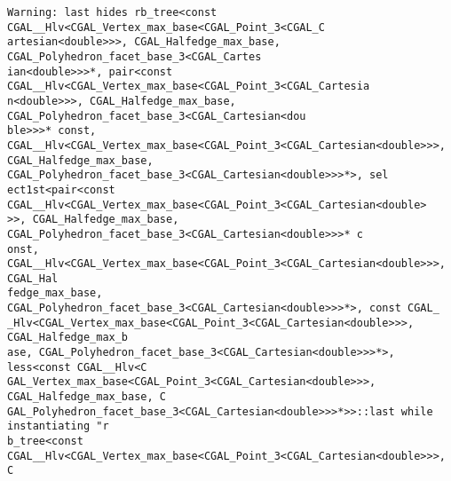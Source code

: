 
\begin{titlepage}
\begin{lcTexBlock}
{\color[gray]{0.2}%
\verb+Warning: last hides rb_tree<const CGAL__Hlv<CGAL_Vertex_max_base<CGAL_Point_3<CGAL_C+\\
\verb+artesian<double>>>, CGAL_Halfedge_max_base, CGAL_Polyhedron_facet_base_3<CGAL_Cartes+\\
\verb+ian<double>>>*, pair<const CGAL__Hlv<CGAL_Vertex_max_base<CGAL_Point_3<CGAL_Cartesia+\\
\verb+n<double>>>, CGAL_Halfedge_max_base, CGAL_Polyhedron_facet_base_3<CGAL_Cartesian<dou+\\
\verb+ble>>>* const, CGAL__Hlv<CGAL_Vertex_max_base<CGAL_Point_3<CGAL_Cartesian<double>>>,+\\
\verb+CGAL_Halfedge_max_base, CGAL_Polyhedron_facet_base_3<CGAL_Cartesian<double>>>*>, sel+\\
\verb+ect1st<pair<const CGAL__Hlv<CGAL_Vertex_max_base<CGAL_Point_3<CGAL_Cartesian<double>+\\
\verb+>>, CGAL_Halfedge_max_base, CGAL_Polyhedron_facet_base_3<CGAL_Cartesian<double>>>* c+\\
\verb+onst, CGAL__Hlv<CGAL_Vertex_max_base<CGAL_Point_3<CGAL_Cartesian<double>>>, CGAL_Hal+\\
\verb+fedge_max_base, CGAL_Polyhedron_facet_base_3<CGAL_Cartesian<double>>>*>, const CGAL_+\\
\verb+_Hlv<CGAL_Vertex_max_base<CGAL_Point_3<CGAL_Cartesian<double>>>, CGAL_Halfedge_max_b+\\
\verb+ase, CGAL_Polyhedron_facet_base_3<CGAL_Cartesian<double>>>*>, less<const CGAL__Hlv<C+\\
\verb+GAL_Vertex_max_base<CGAL_Point_3<CGAL_Cartesian<double>>>, CGAL_Halfedge_max_base, C+\\
\verb+GAL_Polyhedron_facet_base_3<CGAL_Cartesian<double>>>*>>::last while instantiating "r+\\
\verb+b_tree<const CGAL__Hlv<CGAL_Vertex_max_base<CGAL_Point_3<CGAL_Cartesian<double>>>, C+\\
}
\end{lcTexBlock}
\end{titlepage}
